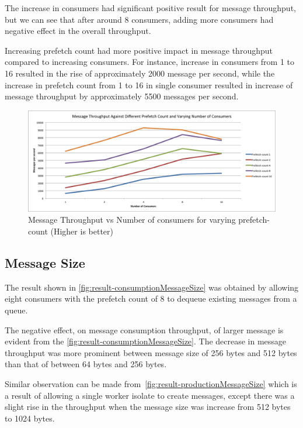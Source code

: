   The increase in consumers had significant positive result for message throughput, but we can see that after around 8 consumers, adding more consumers had negative effect in the overall throughput.

    Increasing prefetch count had more positive impact in message throughput compared to increasing consumers. For instance, increase in consumers from 1 to 16 resulted in the rise of approximately 2000 message per second, while the increase in prefetch count from 1 to 16 in single consumer resulted in increase of message throughput by approximately 5500 messages per second.

\begin{figure}[H]
  \centering
  \includegraphics[width=1\textwidth]{figures/01prefetch}
  \caption[Message Throughput vs Number of consumers for varying prefetch-count]{Message Throughput vs Number of consumers for varying prefetch-count (Higher is better)}
  \label{fig:result-prefetch}
\end{figure}

\subsection{Message Size}
The result shown in \autoref{fig:result-consumptionMessageSize} was obtained by allowing eight consumers with the prefetch count of 8 to dequeue existing messages from a queue.

  The negative effect, on message consumption throughput, of larger message is evident from the  \autoref{fig:result-consumptionMessageSize}. The decrease in message throughput was more prominent between message size of 256 bytes and 512 bytes than that of between 64 bytes and 256 bytes.

  Similar observation can be made from~\autoref{fig:result-productionMessageSize} which is a result of allowing a single worker isolate to create messages, except there was a slight rise in the throughput when the message size was increase from 512 bytes to 1024 bytes.

